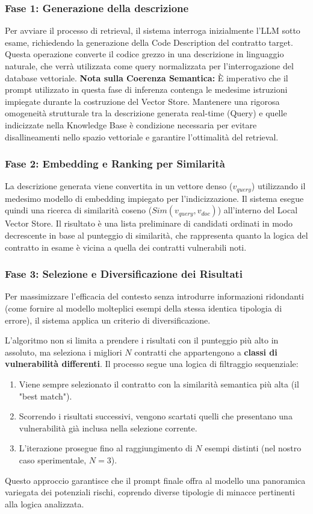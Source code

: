 \subsubsection{Fase 1: Generazione della descrizione}
Per avviare il processo di retrieval, il sistema interroga inizialmente l'LLM sotto esame, richiedendo la generazione della Code Description del contratto target. Questa operazione converte il codice grezzo in una descrizione in linguaggio naturale, che verrà utilizzata come query normalizzata per l'interrogazione del database vettoriale.
\textbf{Nota sulla Coerenza Semantica:} È imperativo che il prompt utilizzato in questa fase di inferenza contenga le medesime istruzioni impiegate durante la costruzione del Vector Store. Mantenere una rigorosa omogeneità strutturale tra la descrizione generata real-time (Query) e quelle indicizzate nella Knowledge Base è condizione necessaria per evitare disallineamenti nello spazio vettoriale e garantire l'ottimalità del retrieval.

\subsubsection{Fase 2: Embedding e Ranking per Similarità}
La descrizione generata viene convertita in un vettore denso ($v_{query}$) utilizzando il medesimo modello di embedding impiegato per l'indicizzazione.
Il sistema esegue quindi una ricerca di similarità coseno ($Sim(v_{query}, v_{doc})$) all'interno del Local Vector Store. Il risultato è una lista preliminare di candidati ordinati in modo decrescente in base al punteggio di similarità, che rappresenta quanto la logica del contratto in esame è vicina a quella dei contratti vulnerabili noti.

\subsubsection{Fase 3: Selezione e Diversificazione dei Risultati}
Per massimizzare l'efficacia del contesto senza introdurre informazioni ridondanti (come fornire al modello molteplici esempi della stessa identica tipologia di errore), il sistema applica un criterio di diversificazione.

L'algoritmo non si limita a prendere i risultati con il punteggio più alto in assoluto, ma seleziona i migliori $N$ contratti che appartengono a \textbf{classi di vulnerabilità differenti}. Il processo segue una logica di filtraggio sequenziale:
\begin{enumerate}
    \item Viene sempre selezionato il contratto con la similarità semantica più alta (il "best match").
    \item Scorrendo i risultati successivi, vengono scartati quelli che presentano una vulnerabilità già inclusa nella selezione corrente.
    \item L'iterazione prosegue fino al raggiungimento di $N$ esempi distinti (nel nostro caso sperimentale, $N=3$).
\end{enumerate}
Questo approccio garantisce che il prompt finale offra al modello una panoramica variegata dei potenziali rischi, coprendo diverse tipologie di minacce pertinenti alla logica analizzata.

